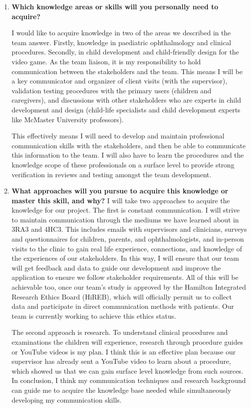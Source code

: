 \documentclass[10pt]{article}
\begin{document}
\begin{enumerate}
    \item \textbf{Which knowledge areas or skills will you personally
    need to acquire?}

    I would like to acquire knowledge in two of the areas we described in the team answer. Firstly,
    knowledge in paediatric ophthalmology and clinical procedures. Secondly, in child development and 
    child-friendly design for the video game. As the team liaison, it is my responsibility to hold 
    communication between the stakeholders and the team. This means I will be a key communicator and 
    organizer of client visits (with the supervisor), validation testing procedures with the primary 
    users (children and caregivers), and discussions with other stakeholders who are experts in 
    child development and design (child-life specialists and child development experts like McMaster 
    University professors).

    This effectively means I will need to develop and maintain professional communication skills with 
    the stakeholders, and then be able to communicate this information to the team. I will also have to 
    learn the procedures and the knowledge scope of these professionals on a surface level to provide 
    strong verification in reviews and testing amongst the team development.

    \item \textbf{What approaches will you pursue to acquire this
    knowledge or master this skill, and why?}
    I will take two approaches to acquire the knowledge for our project. The first is constant
    communication. I will strive to maintain communication through the mediums we have learned 
    about in 3RA3 and 4HC3. This includes emails with supervisors and clinicians, surveys and questionnaires for children, parents, and ophthalmologists, and in-person visits to the clinic
    to gain real life experience, connections, and knowledge of the experiences of our stakeholders.
    In this way, I will ensure that our team will get feedback and data to guide our development 
    and improve the application to ensure we follow stakeholder requirements. All of this will 
    be achievable too, once our team's study is approved by the Hamilton Integrated Research Ethics Board (HiREB), which will officially permit us to 
    collect data and participate in direct communication methods with patients. Our team is 
    currently working to achieve this ethics status.

    The second approach is research. To understand clinical procedures and examinations the children 
    will experience, research through procedure guides or YouTube videos is my plan. I think this is 
    an effective plan because our supervisor has already sent a YouTube video to learn about a procedure, which showed us that we can gain surface level knowledge from such sources. In conclusion, I think 
    my communication techniques and research background can guide me to acquire the knowledge base 
    needed while simultaneously developing my communication skills.

\end{enumerate}
\newpage




\newpage
\end{document}
